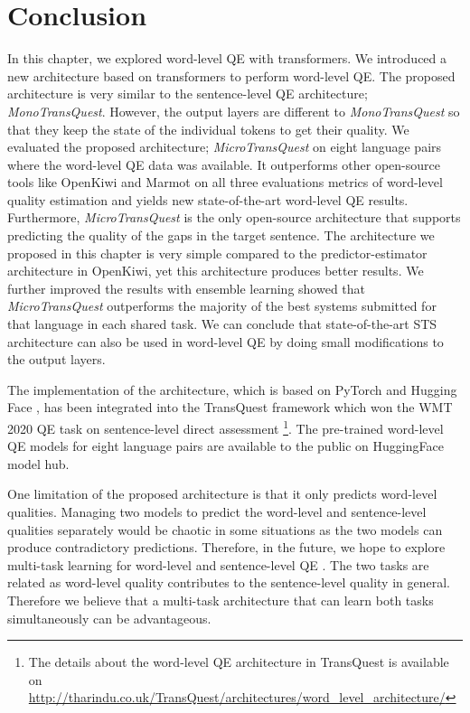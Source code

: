 \section{Conclusion}
In this chapter, we explored word-level QE with transformers. We introduced a new architecture based on transformers to perform word-level QE. The proposed architecture is very similar to the sentence-level QE architecture; \textit{MonoTransQuest}. However, the output layers are different to \textit{MonoTransQuest} so that they keep the state of the individual tokens to get their quality. We evaluated the proposed architecture; \textit{MicroTransQuest} on eight language pairs where the word-level QE data was available.  It outperforms other open-source tools like OpenKiwi and Marmot on all three evaluations metrics of word-level quality estimation and yields new state-of-the-art word-level QE results. Furthermore, \textit{MicroTransQuest} is the only open-source architecture that supports predicting the quality of the gaps in the target sentence. The architecture we proposed in this chapter is very simple compared to the predictor-estimator architecture in OpenKiwi, yet this architecture produces better results. We further improved the results with ensemble learning showed that \textit{MicroTransQuest} outperforms the majority of the best systems submitted for that language in each shared task. We can conclude that state-of-the-art STS architecture can also be used in word-level QE by doing small modifications to the output layers.

The implementation of the architecture, which is based on PyTorch \autocite{NEURIPS2019_9015} and Hugging Face \autocite{wolf-etal-2020-transformers}, has been integrated into the TransQuest framework \autocite{ranasinghe-etal-2020-transquest} which won the WMT 2020 QE task \autocite{specia-etal-2020-findings-wmt} on sentence-level direct assessment \autocite{ranasinghe-etal-2020-transquest-wmt2020}\footnote{The details about the word-level QE architecture in TransQuest is available on \url{http://tharindu.co.uk/TransQuest/architectures/word_level_architecture/}}. The pre-trained word-level QE models for eight language pairs are available to the public on HuggingFace model hub. 

One limitation of the proposed architecture is that it only predicts word-level qualities. Managing two models to predict the word-level and sentence-level qualities separately would be chaotic in some situations as the two models can produce contradictory predictions. Therefore, in the future, we hope to explore multi-task learning for word-level and sentence-level QE \autocite{Caruana1997}. The two tasks are related as word-level quality contributes to the sentence-level quality in general. Therefore we believe that a multi-task architecture that can learn both tasks simultaneously can be advantageous. 

